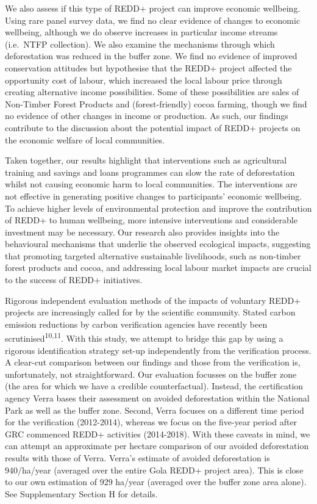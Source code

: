 \documentclass[
]{article}
\begin{document}
We also assess if this type of REDD+ project can improve economic
wellbeing. Using rare panel survey data, we find no clear evidence of
changes to economic wellbeing, although we do observe increases in
particular income streams (i.e.~NTFP collection). We also examine the
mechanisms through which deforestation was reduced in the buffer zone.
We find no evidence of improved conservation attitudes but hypothesise
that the REDD+ project affected the opportunity cost of labour, which
increased the local labour price through creating alternative income
possibilities. Some of these possibilities are sales of Non-Timber
Forest Products and (forest-friendly) cocoa farming, though we find no
evidence of other changes in income or production. As such, our findings
contribute to the discussion about the potential impact of REDD+
projects on the economic welfare of local communities.

Taken together, our results highlight that interventions such as
agricultural training and savings and loans programmes can slow the rate
of deforestation whilst not causing economic harm to local communities.
The interventions are not effective in generating positive changes to
participants' economic wellbeing. To achieve higher levels of
environmental protection and improve the contribution of REDD+ to human
wellbeing, more intensive interventions and considerable investment may
be necessary. Our research also provides insights into the behavioural
mechanisms that underlie the observed ecological impacts, suggesting
that promoting targeted alternative sustainable livelihoods, such as
non-timber forest products and cocoa, and addressing local labour market
impacts are crucial to the success of REDD+ initiatives.

Rigorous independent evaluation methods of the impacts of voluntary
REDD+ projects are increasingly called for by the scientific community.
Stated carbon emission reductions by carbon verification agencies have
recently been scrutinised\textsuperscript{10,11}. With this study, we
attempt to bridge this gap by using a rigorous identification strategy
set-up independently from the verification process. A clear-cut
comparison between our findings and those from the verification is,
unfortunately, not straightforward. Our evaluation focusses on the
buffer zone (the area for which we have a credible counterfactual).
Instead, the certification agency Verra bases their assessment on
avoided deforestation within the National Park as well as the buffer
zone. Second, Verra focuses on a different time period for the
verification (2012-2014), whereas we focus on the five-year period after
GRC commenced REDD+ activities (2014-2018). With these caveats in mind,
we can attempt an approximate per hectare comparison of our avoided
deforestation results with those of Verra. Verra's estimate of avoided
deforestation is 940/ha/year (averaged over the entire Gola REDD+
project area). This is close to our own estimation of 929 ha/year
(averaged over the buffer zone area alone). See Supplementary Section H
for details.
\end{document}
